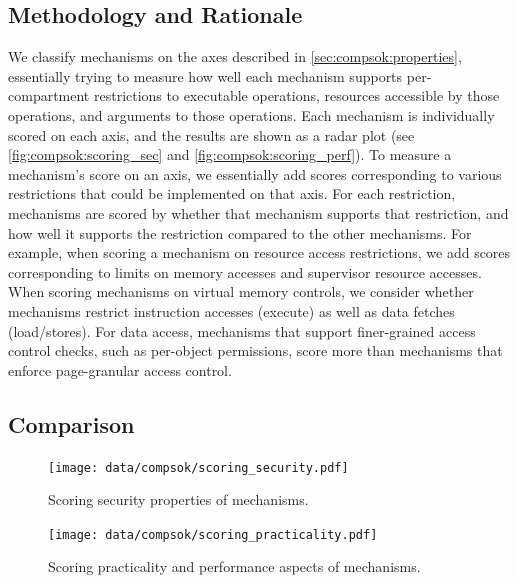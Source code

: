 \subsection{Methodology and Rationale}
\label{sec:compsok:methodology}
We classify mechanisms on the axes described in 
\autoref{sec:compsok:properties}, essentially trying to measure how well 
each mechanism supports per-compartment restrictions to executable operations,
resources accessible by those operations, and arguments to those operations.
Each mechanism is individually scored on each axis, and the results are shown
as a radar plot (see \autoref{fig:compsok:scoring_sec} and 
\autoref{fig:compsok:scoring_perf}).
To measure a mechanism's score on an axis, we essentially add scores 
corresponding to various restrictions that could be implemented on that axis.
For each restriction, mechanisms are scored by whether that mechanism supports
that restriction, and how well it supports the restriction compared to the 
other mechanisms.
For example, when scoring a mechanism on resource access restrictions, we
add scores corresponding to limits on memory accesses and supervisor resource
accesses.
When scoring mechanisms on virtual memory controls, we consider whether
mechanisms restrict instruction accesses (execute) as well as 
data fetches (load/stores).
For data access, mechanisms that support finer-grained access control checks, 
such as per-object permissions, score more than mechanisms that enforce 
page-granular access control.

\subsection{Comparison}
\label{sec:compsok:comparison}
\begin{figure}
  \centering
  \texttt{[image: data/compsok/scoring\_security.pdf]}
  \caption[Scoring security properties of mechanisms.]
          {Scoring security properties of mechanisms.}
  \label{fig:compsok:scoring_sec}
\end{figure}

\begin{figure}
  \centering
  \texttt{[image: data/compsok/scoring\_practicality.pdf]}
  \caption[Scoring practicality and performance aspects of mechanisms.]
          {Scoring practicality and performance aspects of mechanisms.}
  \label{fig:compsok:scoring_perf}
\end{figure}

